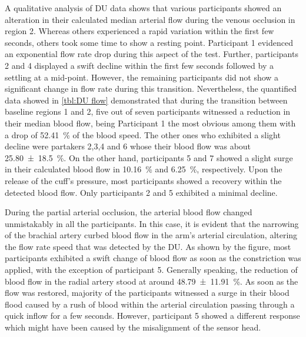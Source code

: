 A qualitative analysis of DU data shows that various participants showed an alteration in their calculated median arterial flow during the venous occlusion in region 2. Whereas others experienced a rapid variation within the first few seconds, others took some time to show a resting point. Participant 1 evidenced an exponential flow rate drop during this aspect of the test. Further, participants 2 and 4 displayed a swift decline within the first few seconds followed by a settling at a mid-point. However, the remaining participants did not show a significant change in flow rate during this transition. Nevertheless, the quantified data showed in \ref{tbl:DU flow} demonstrated that during the transition between baseline regions 1 and 2, five out of seven participants witnessed a reduction in their median blood flow, being Participant 1 the most obvious among them with a drop of \SI{52.41}{\percent} of the blood speed. The other ones who exhibited a slight decline were partakers 2,3,4 and 6 whose their blood flow was about \SI{25.80(1850)}{\percent}. On the other hand, participants 5 and 7 showed a slight surge in their calculated blood flow in \SI{10.16}{\percent} and \SI{6.25}{\percent}, respectively. Upon the release of the cuff's pressure, most participants showed a recovery within the detected blood flow. Only participants 2 and 5 exhibited a minimal decline.

During the partial arterial occlusion, the arterial blood flow changed unmistakably in all the participants. In this case, it is evident that the narrowing of the brachial artery curbed blood flow in the arm's arterial circulation, altering the flow rate speed that was detected by the DU. As shown by the figure, most participants exhibited a swift change of blood flow as soon as the constriction was applied, with the exception of participant 5. Generally speaking, the reduction of blood flow in the radial artery stood at around \SI{48.79(1191)}{\percent}. As soon as the flow was restored, majority of the participants witnessed a surge in their blood flood caused by a rush of blood within the arterial circulation passing through a quick inflow for a few seconds. However, participant 5 showed a different response which might have been caused by the misalignment of the sensor head.  

